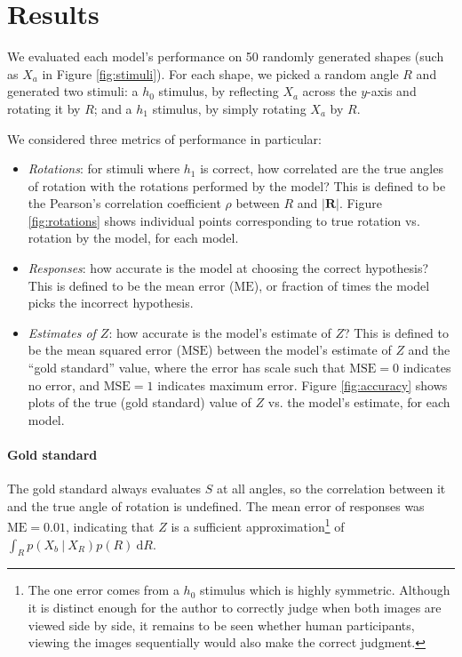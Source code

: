 \documentclass{article} %
\begin{document}
\section{Results}

We evaluated each model's performance on 50 randomly generated shapes
(such as $X_a$ in Figure \ref{fig:stimuli}). For each shape, we picked
a random angle $R$ and generated two stimuli: a $h_0$ stimulus, by
reflecting $X_a$ across the $y$-axis and rotating it by $R$; and a
$h_1$ stimulus, by simply rotating $X_a$ by $R$.

We considered three metrics of performance in particular:
\begin{itemize}
\item \textit{Rotations}: for stimuli where $h_1$ is correct, how
  correlated are the true angles of rotation with the rotations
  performed by the model? This is defined to be the Pearson's
  correlation coefficient $\rho$ between $R$ and $\vert
  \mathbf{R}\vert$. Figure \ref{fig:rotations} shows individual points
  corresponding to true rotation vs. rotation by the model, for each
  model.
\item \textit{Responses}: how accurate is the model at choosing the
  correct hypothesis? This is defined to be the mean error
  ($\mathrm{ME}$), or fraction of times the model picks the incorrect
  hypothesis.
\item \textit{Estimates of $Z$}: how accurate is the model's estimate
  of $Z$? This is defined to be the mean squared error
  ($\mathrm{MSE}$) between the model's estimate of $Z$ and the ``gold
  standard'' value, where the error has scale such that
  $\mathrm{MSE}=0$ indicates no error, and $\mathrm{MSE}=1$ indicates
  maximum error. Figure \ref{fig:accuracy} shows plots of the true
  (gold standard) value of $Z$ vs. the model's estimate, for each
  model.
\end{itemize}

\paragraph{Gold standard} 

The gold standard always evaluates $S$ at all angles, so the
correlation between it and the true angle of rotation is
undefined. The mean error of responses was $\mathrm{ME}=0.01$,
indicating that $Z$ is a sufficient approximation\footnote{The one
  error comes from a $h_0$ stimulus which is highly
  symmetric. Although it is distinct enough for the author to
  correctly judge when both images are viewed side by side, it remains
  to be seen whether human participants, viewing the images
  sequentially would also make the correct judgment.}  of $\int_R
p(X_b\ \vert\ X_R)p(R)\ \mathrm{d}R$.
\end{document}
